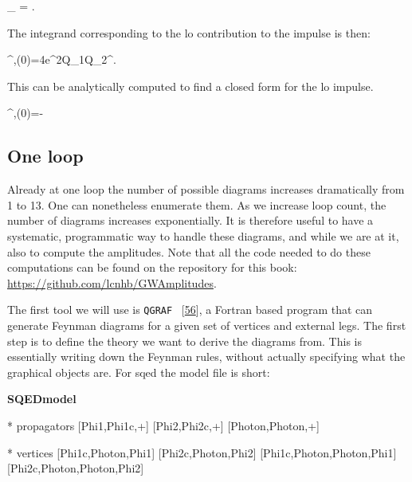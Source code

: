 \documentclass[
  11pt,
  a4paper,
  DIV=11,
  numbers=noendperiod,
  twoside]{scrreprt}
\newenvironment{Shaded}{\begin{snugshade}}{\end{snugshade}}
\newcommand{\NormalTok}[1]{\textcolor[rgb]{0.00,0.23,0.31}{#1}}
\let\[\relax \let\]\relax %
\DeclareRobustCommand{\[}{\begin{equation}}
\DeclareRobustCommand{\]}{\end{equation}}
\begin{document}
\[
\lim\limits_{\hbar {}} \dPsb{\tw}=\dn[4]{\tw} {\ndeltafn{2\mass[1]\cls{\vel[1]}\cdot\tw}}{\ndeltafn{2\mass[2]\cls{\vel[2]}\cdot \tw }}.
\]

The integrand corresponding to the \gls{lo} contribution to the impulse
is then:

\[
\Delta \emom[1]^{\mu,(0)}=4e^2Q_1Q_2\mass[1]\mass[2]\relfact\int\dn[4]{\tw}\tw^\mu {}.
\]

This can be analytically computed to find a closed form for the \gls{lo}
impulse.

\[
\Delta \emom[1]^{\mu,(0)}=-  
\]

\hypertarget{one-loop}{%
\subsection{One loop}\label{one-loop}}

Already at one loop the number of possible diagrams increases
dramatically from 1 to 13. One can nonetheless enumerate them. As we
increase loop count, the number of diagrams increases exponentially. It
is therefore useful to have a systematic, programmatic way to handle
these diagrams, and while we are at it, also to compute the amplitudes.
Note that all the code needed to do these computations can be found on
the repository for this book:
\url{https://github.com/lcnhb/GWAmplitudes}.

The first tool we will use is \texttt{QGRAF}
~{[}\protect\hyperlink{ref-Nogueira:1993a}{56}{]}, a Fortran based
program that can generate Feynman diagrams for a given set of vertices
and external legs. The first step is to define the theory we want to
derive the diagrams from. This is essentially writing down the Feynman
rules, without actually specifying what the graphical objects are. For
\gls{sqed} the model file is short:

\textbf{SQEDmodel}

\begin{Shaded}
\begin{Highlighting}[]
\NormalTok{* propagators}
\NormalTok{ [Phi1,Phi1c,+]}
\NormalTok{ [Phi2,Phi2c,+]}
\NormalTok{ [Photon,Photon,+]}

\NormalTok{* vertices}
\NormalTok{ [Phi1c,Photon,Phi1]}
\NormalTok{ [Phi2c,Photon,Phi2]}
\NormalTok{ [Phi1c,Photon,Photon,Phi1]}
\NormalTok{ [Phi2c,Photon,Photon,Phi2]}
\end{Highlighting}
\end{Shaded}
\end{document}
